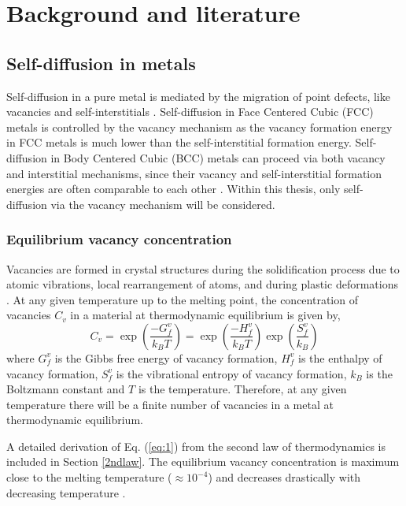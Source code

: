\documentclass{article}
\begin{document}
\section{Background and literature}

\subsection{Self-diffusion in metals}

Self-diffusion in a pure metal is mediated by the migration of point defects, like vacancies and self-interstitials \cite{Shewmon2016}. Self-diffusion in Face Centered Cubic (FCC) metals is controlled by the vacancy mechanism \cite{Mehrer1978} as the vacancy formation energy in FCC metals is much lower than the self-interstitial formation energy. Self-diffusion in Body Centered Cubic (BCC) metals can proceed via both vacancy and interstitial mechanisms, since their vacancy and self-interstitial formation energies are often comparable to each other \cite{Mendelev2007}. Within this thesis, only self-diffusion via the vacancy mechanism will be considered.

\subsubsection{Equilibrium vacancy concentration}

Vacancies are formed in crystal structures during the solidification process due to atomic vibrations, local rearrangement of atoms, and during plastic deformations \cite{Ehrhart1992}. At any given temperature up to the melting point, the concentration of vacancies $C_v$ in a material at thermodynamic equilibrium is given by,
%
\begin{equation} \label{eq:1}
C_v = \exp\left(\dfrac{-G^v_f}{k_B T}\right) = \exp\left(\dfrac{-H^v_f}{k_B T}\right) \exp\left(\dfrac{S^v_f}{k_B}\right)
\end{equation}
%
where $G^v_f$ is the Gibbs free energy of vacancy formation, $H^v_f$ is the enthalpy of vacancy formation, $S^v_f$ is the vibrational entropy of vacancy formation, $k_B$ is the Boltzmann constant and $T$ is the temperature. Therefore, at any given temperature there will be a finite number of vacancies in a metal at thermodynamic equilibrium.

A detailed derivation of Eq. (\ref{eq:1}) from the second law of thermodynamics is included in Section \ref{2ndlaw}. The equilibrium vacancy concentration is maximum close to the melting temperature ($\approx10^{-4}$) and decreases drastically with decreasing temperature \cite{Gottstein2004}. 
\end{document}
